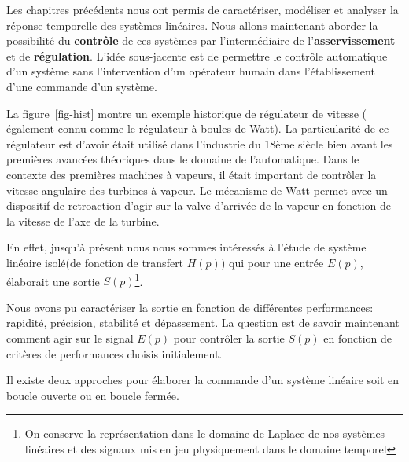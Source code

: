 Les chapitres précédents nous ont permis de caractériser, modéliser et
analyser la réponse temporelle des systèmes linéaires.
Nous allons maintenant aborder la possibilité du \textbf{contrôle} de ces 
systèmes par l'intermédiaire de l'\textbf{asservissement} et de 
\textbf{régulation}. 
L'idée sous-jacente est de permettre le contrôle automatique d'un système
sans l'intervention d'un opérateur humain dans l'établissement d'une commande
d'un système. 

La figure~\ref{fig-hist} montre un exemple historique de 
régulateur de vitesse ( également connu comme le régulateur à boules de Watt). 
La particularité de ce régulateur est d'avoir était utilisé dans l'industrie
du 18ème siècle bien avant les premières avancées théoriques dans le domaine 
de l'automatique. Dans le contexte des premières machines à vapeurs, 
il était important de contrôler la vitesse angulaire des turbines à vapeur. 
Le mécanisme de Watt permet avec un dispositif de retroaction d'agir sur la 
valve d'arrivée de la vapeur en fonction de la vitesse de l'axe de la turbine.

En effet, jusqu'à présent nous nous sommes intéressés à l'étude de système 
linéaire \og isolé\fg (de fonction de transfert $H(p)$) 
qui pour une entrée $E(p)$, élaborait une sortie $S(p)$\footnote{On conserve 
la représentation dans le domaine de Laplace de nos systèmes linéaires et 
des signaux mis en jeu physiquement dans le domaine temporel}.

\begin{center}
\end{center}

Nous avons pu caractériser la sortie en fonction de différentes 
performances: rapidité, précision, stabilité et dépassement. 
La question est de savoir maintenant comment agir sur le 
signal $E(p)$ pour contrôler la sortie $S(p)$ en fonction de critères
de performances choisis initialement.

Il existe deux approches pour élaborer la commande 
d'un système linéaire soit en boucle ouverte ou en boucle fermée.

